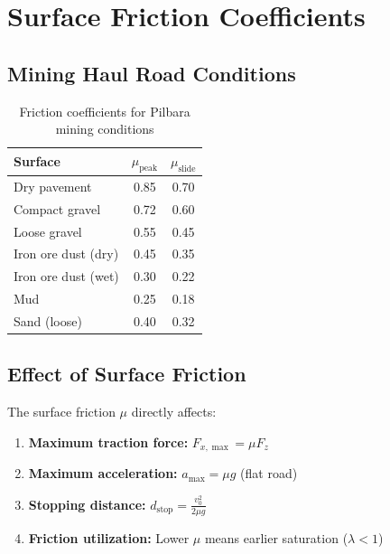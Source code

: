 \documentclass[11pt,a4paper]{article}
\begin{document}
\section{Surface Friction Coefficients}

\subsection{Mining Haul Road Conditions}

\begin{table}[H]
\centering
\begin{tabular}{lcc}
\toprule
\textbf{Surface} & $\mu_{\text{peak}}$ & $\mu_{\text{slide}}$ \\
\midrule
Dry pavement & 0.85 & 0.70 \\
Compact gravel & 0.72 & 0.60 \\
Loose gravel & 0.55 & 0.45 \\
Iron ore dust (dry) & 0.45 & 0.35 \\
Iron ore dust (wet) & 0.30 & 0.22 \\
Mud & 0.25 & 0.18 \\
Sand (loose) & 0.40 & 0.32 \\
\bottomrule
\end{tabular}
\caption{Friction coefficients for Pilbara mining conditions}
\end{table}

\subsection{Effect of Surface Friction}

The surface friction $\mu$ directly affects:

\begin{enumerate}
    \item \textbf{Maximum traction force:} $F_{x,\max} = \mu F_z$
    \item \textbf{Maximum acceleration:} $a_{\max} = \mu g$ (flat road)
    \item \textbf{Stopping distance:} $d_{\text{stop}} = \frac{v_0^2}{2\mu g}$
    \item \textbf{Friction utilization:} Lower $\mu$ means earlier saturation ($\lambda < 1$)
\end{enumerate}

\end{document}
